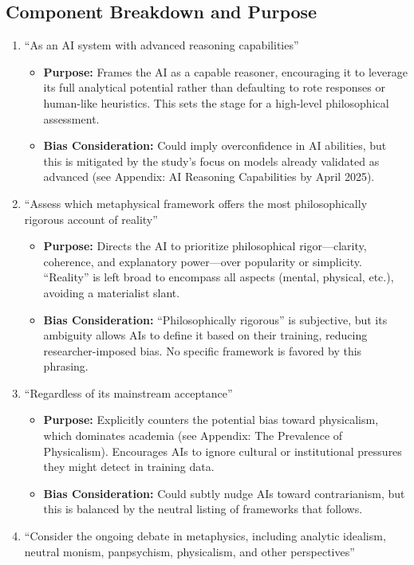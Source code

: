 \documentclass[11pt]{article}
\begin{document}
\subsection{Component Breakdown and Purpose}
\begin{enumerate}
  \item ``As an AI system with advanced reasoning capabilities''
    \begin{itemize}
      \item \textbf{Purpose:} Frames the AI as a capable reasoner, encouraging it to leverage its full analytical potential rather than defaulting to rote responses or human-like heuristics. This sets the stage for a high-level philosophical assessment.
      \item \textbf{Bias Consideration:} Could imply overconfidence in AI abilities, but this is mitigated by the study’s focus on models already validated as advanced (see Appendix: AI Reasoning Capabilities by April 2025).
    \end{itemize}
  \item ``Assess which metaphysical framework offers the most philosophically rigorous account of reality''
    \begin{itemize}
      \item \textbf{Purpose:} Directs the AI to prioritize philosophical rigor---clarity, coherence, and explanatory power---over popularity or simplicity. ``Reality'' is left broad to encompass all aspects (mental, physical, etc.), avoiding a materialist slant.
      \item \textbf{Bias Consideration:} ``Philosophically rigorous'' is subjective, but its ambiguity allows AIs to define it based on their training, reducing researcher-imposed bias. No specific framework is favored by this phrasing.
    \end{itemize}
  \item ``Regardless of its mainstream acceptance''
    \begin{itemize}
      \item \textbf{Purpose:} Explicitly counters the potential bias toward physicalism, which dominates academia (see Appendix: The Prevalence of Physicalism). Encourages AIs to ignore cultural or institutional pressures they might detect in training data.
      \item \textbf{Bias Consideration:} Could subtly nudge AIs toward contrarianism, but this is balanced by the neutral listing of frameworks that follows.
    \end{itemize}
  \item ``Consider the ongoing debate in metaphysics, including analytic idealism, neutral monism, panpsychism, physicalism, and other perspectives''

\end{enumerate}
\end{document}
